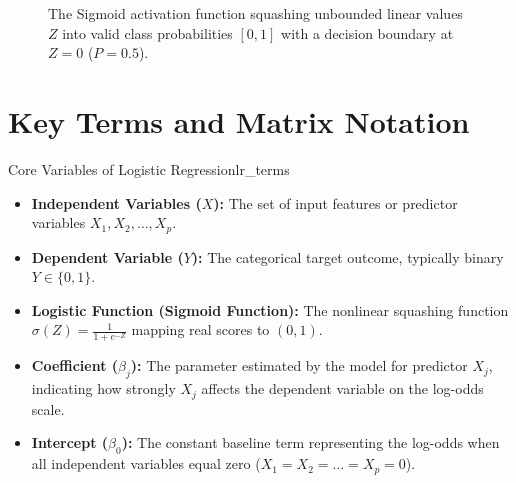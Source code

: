 \begin{figure}[htbp]
\caption{The Sigmoid activation function squashing unbounded linear values $Z$ into valid class probabilities $[0, 1]$ with a decision boundary at $Z = 0$ ($P = 0.5$).}
\label{fig:sigmoid_activation}
\end{figure}

\newpage
\section{Key Terms and Matrix Notation}

\begin{definition}{Core Variables of Logistic Regression}{lr_terms}
\begin{itemize}
    \item \textbf{Independent Variables ($X$):} The set of input features or predictor variables $X_1, X_2, \dots, X_p$.
    \item \textbf{Dependent Variable ($Y$):} The categorical target outcome, typically binary $Y \in \{0, 1\}$.
    \item \textbf{Logistic Function (Sigmoid Function):} The nonlinear squashing function $\sigma(Z) = \frac{1}{1 + e^{-Z}}$ mapping real scores to $(0, 1)$.
    \item \textbf{Coefficient ($\beta_j$):} The parameter estimated by the model for predictor $X_j$, indicating how strongly $X_j$ affects the dependent variable on the log-odds scale.
    \item \textbf{Intercept ($\beta_0$):} The constant baseline term representing the log-odds when all independent variables equal zero ($X_1 = X_2 = \dots = X_p = 0$).
\end{itemize}
\end{definition}

